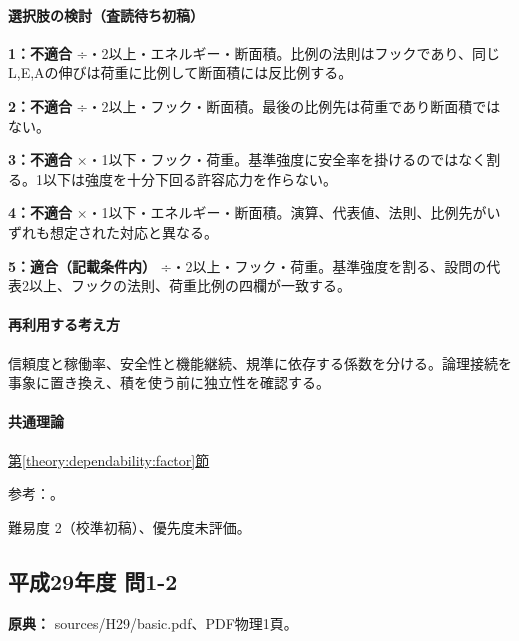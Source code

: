 \paragraph{選択肢の検討（査読待ち初稿）}\mbox{}\par

\noindent\textbf{1：不適合} ÷・2以上・エネルギー・断面積。比例の法則はフックであり、同じL,E,Aの伸びは荷重に比例して断面積には反比例する。\par

\noindent\textbf{2：不適合} ÷・2以上・フック・断面積。最後の比例先は荷重であり断面積ではない。\par

\noindent\textbf{3：不適合} ×・1以下・フック・荷重。基準強度に安全率を掛けるのではなく割る。1以下は強度を十分下回る許容応力を作らない。\par

\noindent\textbf{4：不適合} ×・1以下・エネルギー・断面積。演算、代表値、法則、比例先がいずれも想定された対応と異なる。\par

\noindent\textbf{5：適合（記載条件内）} ÷・2以上・フック・荷重。基準強度を割る、設問の代表2以上、フックの法則、荷重比例の四欄が一致する。\par

\paragraph{再利用する考え方} 信頼度と稼働率、安全性と機能継続、規準に依存する係数を分ける。論理接続を事象に置き換え、積を使う前に独立性を確認する。

\paragraph{共通理論} \hyperref[theory:dependability:factor]{第\ref*{theory:dependability:factor}節}

\par 参考：\cite{struct_mit_beam,design_faa_2011}。

\par 難易度 2（校準初稿）、優先度未評価。

\subsection{平成29年度 問1-2}
\label{q:h29-reg-basic-1-2}

\noindent\textbf{原典：} sources/H29/basic.pdf、PDF物理1頁。

